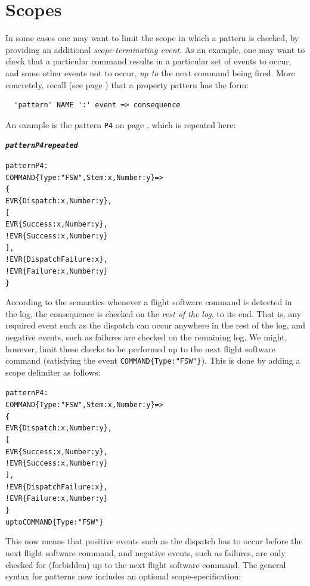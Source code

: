 \documentclass{report}
\newenvironment{code}[1] %
{
\vspace{0.5cm}
\begin{center}
\begin{Sbox}
\begin{minipage}{11cm}
\begin{alltt}
{\bf\em #1}
}
{
\end{alltt}
\end{minipage}
\end{Sbox}
\setlength{\fboxsep}{8pt}
\fbox{\TheSbox}
\end{center}
\vspace{0.5cm}
}
\begin{document}
\section{Scopes}

In some cases one may want to limit the scope in which a pattern is checked,
by providing an additional  {\em scope-terminating event}. As an example, one may want
to check that a particular command results in a particular set of events to occur, and some 
other events not to occur, {\em up to} the next command being fired. More concretely,
recall (see page \pageref{pattern-syntax}) that a property pattern has the form:

\begin{verbatim}
  'pattern' NAME ':' event => consequence
\end{verbatim}
 
\noindent
An example is the pattern {\tt P4} on page \pageref{pattern:p4}, which is repeated here:
  
\begin{code}{pattern P4 repeated}
  pattern P4 :
    COMMAND\{Type: "FSW", Stem: x, Number: y\} => 
      \{
          EVR\{Dispatch: x, Number: y\}, 
          [
              EVR\{Success: x, Number: y\}, 
            ! EVR\{Success: x, Number: y\}
          ],
        ! EVR\{DispatchFailure: x\},
        ! EVR\{Failure : x, Number : y\}
      \}
\end{code}

\noindent According to the semantics whenever a flight software command is detected in the log,
the consequence is checked on the {\em rest of the log}, to its end. That is, any required event such
as the dispatch can occur anywhere in the rest of the log, and negative events, such as failures
are checked on the remaining log. We might, however, limit these checks to be performed up to the
next flight software command (satisfying the event {\tt COMMAND\{Type:"FSW"\}}). 
This is done by adding a scope delimiter as follows:

\begin{code}{}
  pattern P4 :
    COMMAND\{Type: "FSW", Stem: x, Number: y\} => 
      \{
          EVR\{Dispatch: x, Number: y\}, 
          [
              EVR\{Success: x, Number: y\}, 
            ! EVR\{Success: x, Number: y\}
          ],
        ! EVR\{DispatchFailure: x\},
        ! EVR\{Failure : x, Number : y\}
      \}
      upto COMMAND\{Type: "FSW"\} 
\end{code}
  
\noindent This now means that positive events such as the dispatch has to occur before the
next flight software command, and negative events, such as failures, are only checked for (forbidden)
up to the next flight software command. The  general syntax for patterns now includes an 
optional scope-specification:
\end{document}
